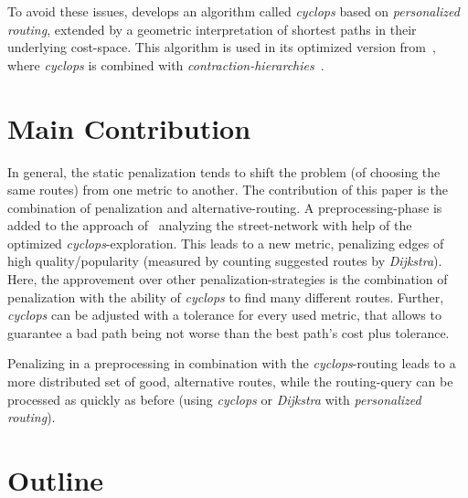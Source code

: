         To avoid these issues, \cite{barth:alternative_routes} develops an algorithm called \textit{cyclops} based on \textit{personalized routing}, extended by a geometric interpretation of shortest paths in their underlying cost-space.
        This algorithm is used in its optimized version from~\cite{barth:alternative_multicriteria_routes}, where \textit{cyclops} is combined with \textit{contraction-hierarchies}~\cite{geisberger:contraction_hierarchies}.

\section{Main Contribution}

    In general, the static penalization tends to shift the problem (of choosing the same routes) from one metric to another.
    The contribution of this paper is the combination of penalization and alternative-routing.
    A preprocessing-phase is added to the approach of~\cite{barth:alternative_multicriteria_routes} analyzing the street-network with help of the optimized \textit{cyclops}-exploration.
    This leads to a new metric, penalizing edges of high quality/popularity (measured by counting suggested routes by \textit{Dijkstra}).
    Here, the approvement over other penalization-strategies is the combination of penalization with the ability of \textit{cyclops} to find many different routes.
    Further, \textit{cyclops} can be adjusted with a tolerance for every used metric, that allows to guarantee a bad path being not worse than the best path's cost plus tolerance.

    Penalizing in a preprocessing in combination with the \textit{cyclops}-routing leads to a more distributed set of good, alternative routes, while the routing-query can be processed as quickly as before (using \textit{cyclops} or \textit{Dijkstra} with \textit{personalized routing}).

\section{Outline}

